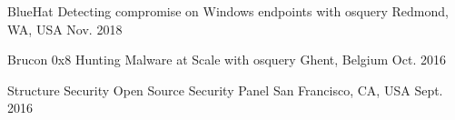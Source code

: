\begin{cvhonors}

\cvhonor
{BlueHat} %
{Detecting compromise on Windows endpoints with osquery} %
{Redmond, WA, USA} %
{Nov. 2018} %


\cvhonor
{Brucon 0x8} %
{Hunting Malware at Scale with osquery} %
{Ghent, Belgium} %
{Oct. 2016} %


\cvhonor
{Structure Security} %
{Open Source Security Panel} %
{San Francisco, CA, USA} %
{Sept. 2016} %


\end{cvhonors}
